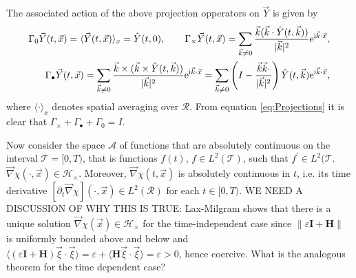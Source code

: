 \documentclass[11pt]{amsart}
\newcommand{\I}{\mathrm{i}}
\newcommand{\e}{\mathrm{e}}
\newcommand{\Hb}{\mathbf{H}}
\newcommand{\Ib}{\mathbf{I}}
\begin{document}
%
The associated action of the above projection opperators on
$\vec{Y}$ is given by \cite{Fannjiang:SIAM_JAM:333} 
%
\begin{align}\label{eq:Projections}
  \Gamma_0\vec{Y}(t,\vec{x})
    =\langle\vec{Y}(t,\vec{x})\rangle_x
    =\hat{Y}(t,0),
    \qquad
  \Gamma_\times\vec{Y}(t,\vec{x})
    =\sum_{\vec{k}\neq0}
       \frac{\vec{k}(\vec{k}\cdot\hat{Y}(t,\vec{k}))}{|\vec{k}|^2}
       \e^{\I\vec{k}\cdot\vec{x}},
    \\
  \Gamma_\bullet\vec{Y}(t,\vec{x})
    =\sum_{\vec{k}\neq0}
       \frac{\vec{k}\times(\vec{k}\times\hat{Y}(t,\vec{k}))}{|\vec{k}|^2}
       \e^{\I\vec{k}\cdot\vec{x}}
    =\sum_{\vec{k}\neq0}\left(I-
       \frac{\vec{k}\vec{k}\cdot}{|\vec{k}|^2}\right) 
       \hat{Y}(t,\vec{k})  \e^{\I\vec{k}\cdot\vec{x}},
       \notag
\end{align}
%
where $\langle\cdot\rangle_x$ denotes spatial averaging over $\mathcal{R}$. From
equation \eqref{eq:Projections} it is clear that $\Gamma_\times+\Gamma_\bullet+\Gamma_0=I$.


Now consider the space $\mathscr{A}$ of functions that are absolutely
continuous on the interval $\mathcal{T}=[0,T)$, that is functions
$f(t)$, $f\in L^2(\mathcal{T})$, such that $f^\prime\in L^2(\mathcal{T}$. 
$\vec{\nabla}\chi(\cdot,\vec{x})\in\mathscr{H}_\times$. Moreover,
$\vec{\nabla}\chi(t,\vec{x})$ is absolutely continuous in $t$, i.e. its time
derivative $[\partial_t\vec{\nabla}\chi](\cdot,\vec{x})\in L^2(\mathcal{R})$ for each $t\in[0,T)$.
WE NEED A DISCUSSION OF WHY THIS IS TRUE: Lax-Milgram shows that there
is a unique solution $\vec{\nabla}\chi(\vec{x})\in\mathscr{H}_\times$ for the
time-independent case since $\|\varepsilon\Ib+\Hb\|$ is uniformly bounded above
and below and
$\langle(\varepsilon\Ib+\Hb)\vec{\xi}\cdot\vec{\xi}\rangle=\varepsilon+\langle\Hb\vec{\xi}\cdot\vec{\xi}\rangle=\varepsilon>0$, hence
coercive. What is the analogous theorem for the time dependent case?
\end{document}
